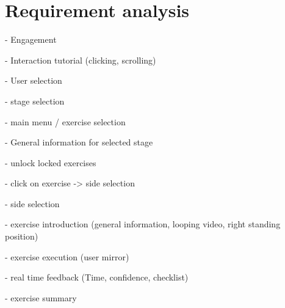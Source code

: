 \section{Requirement analysis}\label{3_1_requirements}
- Engagement

- Interaction tutorial (clicking, scrolling)

- User selection

- stage selection

- main menu / exercise selection

- General information for selected stage

- unlock locked exercises

- click on exercise -> side selection

- side selection

- exercise introduction (general information, looping video, right standing position)

- exercise execution (user mirror)

- real time feedback (Time, confidence, checklist)

- exercise summary